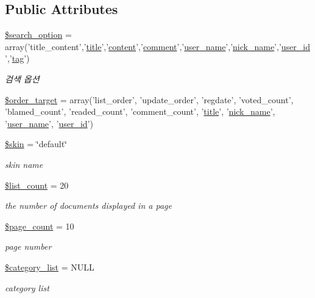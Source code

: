 \subsection*{Public Attributes}
\begin{DoxyCompactItemize}
\item 
\hyperlink{classboard_a6affe0c86966ebd06572cc4c8abde32b}{\$search\+\_\+option} = array('title\+\_\+content','\hyperlink{ko_8install_8php_a5b072c5fd1d2228c6ba5cee13cd142e3}{title}','\hyperlink{classcontent}{content}','\hyperlink{classcomment}{comment}','\hyperlink{ko_8install_8php_a115401aff7da80e73c66e9f76505426b}{user\+\_\+name}','\hyperlink{ko_8install_8php_a151ecae87a1f3d7e257aa089803086bd}{nick\+\_\+name}','\hyperlink{ko_8install_8php_a74f1a394389d774e5b4cd5d1d15413f7}{user\+\_\+id}','\hyperlink{classtag}{tag}')
\begin{DoxyCompactList}\small\item\em 검색 옵션 \end{DoxyCompactList}\item 
\hyperlink{classboard_a66d1965fe6a51e8143499adeaf3998cc}{\$order\+\_\+target} = array('list\+\_\+order', 'update\+\_\+order', 'regdate', 'voted\+\_\+count', 'blamed\+\_\+count', 'readed\+\_\+count', 'comment\+\_\+count', '\hyperlink{ko_8install_8php_a5b072c5fd1d2228c6ba5cee13cd142e3}{title}', '\hyperlink{ko_8install_8php_a151ecae87a1f3d7e257aa089803086bd}{nick\+\_\+name}', '\hyperlink{ko_8install_8php_a115401aff7da80e73c66e9f76505426b}{user\+\_\+name}', '\hyperlink{ko_8install_8php_a74f1a394389d774e5b4cd5d1d15413f7}{user\+\_\+id}')
\item 
\hyperlink{classboard_ac7e864ad1db563c4d3f97291dd90291f}{\$skin} = \char`\"{}default\char`\"{}
\begin{DoxyCompactList}\small\item\em skin name \end{DoxyCompactList}\item 
\hyperlink{classboard_ab66c6932a082c110ebd921c0be8d6788}{\$list\+\_\+count} = 20
\begin{DoxyCompactList}\small\item\em the number of documents displayed in a page \end{DoxyCompactList}\item 
\hyperlink{classboard_ab5d2d3925f753039483da2c65076122b}{\$page\+\_\+count} = 10
\begin{DoxyCompactList}\small\item\em page number \end{DoxyCompactList}\item 
\hyperlink{classboard_aee8ebe65314796fea517f8f7875a4b8f}{\$category\+\_\+list} = N\+U\+L\+L
\begin{DoxyCompactList}\small\item\em category list \end{DoxyCompactList}\end{DoxyCompactItemize}


